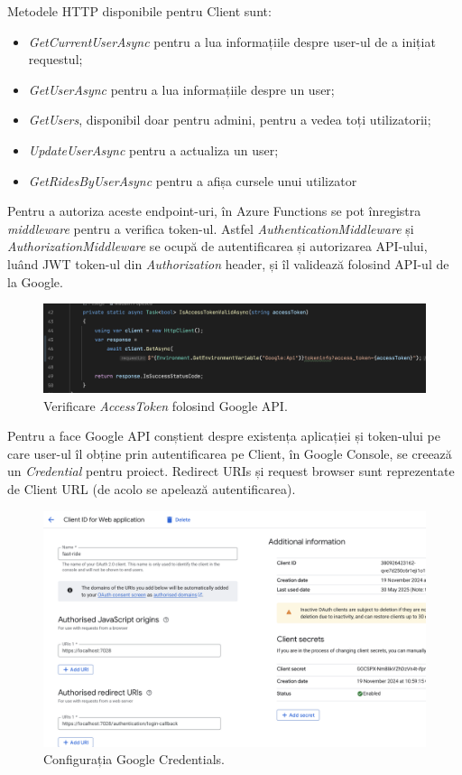 Metodele HTTP disponibile pentru Client sunt:
\begin{itemize}
    \item \textit{GetCurrentUserAsync} pentru a lua informațiile despre user-ul de a inițiat requestul;
    \item \textit{GetUserAsync} pentru a lua informațiile despre un user;
    \item \textit{GetUsers}, disponibil doar pentru admini, pentru a vedea toți utilizatorii;
    \item \textit{UpdateUserAsync} pentru a actualiza un user;
    \item \textit{GetRidesByUserAsync} pentru a afișa cursele unui utilizator
\end{itemize}

Pentru a autoriza aceste endpoint-uri, în Azure Functions se pot înregistra \textit{middleware} pentru
a verifica token-ul. Astfel \textit{AuthenticationMiddleware} și \textit{AuthorizationMiddleware} se ocupă de autentificarea
și autorizarea API-ului, luând JWT token-ul din \textit{Authorization} header, și îl validează
folosind API-ul de la Google.

\begin{figure}[H]
    \centering
    \includegraphics[width=16cm]{Assets/GoogleAuthorization.png}
    \caption{Verificare \textit{AccessToken} folosind Google API.}
    \label{fig:GoogleAuthorization}
\end{figure}

Pentru a face Google API conștient despre existența aplicației și token-ului pe care user-ul îl obține
prin autentificarea pe Client, în Google Console, se creează un \textit{Credential} pentru proiect.
Redirect URIs și request browser sunt reprezentate de Client URL (de acolo se apelează autentificarea).

\begin{figure}[H]
    \centering
    \includegraphics[width=14cm]{Assets/GoogleConfig.png}
    \caption{Configurația Google Credentials.}
    \label{fig:GoogleConfig}
\end{figure}

